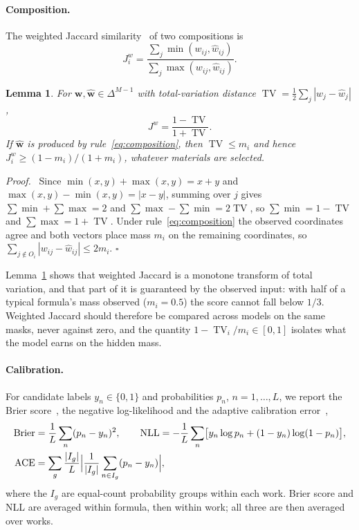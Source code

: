 \documentclass[applsci,article,submit,oneauthor]{Definitions/mdpi}
\newcommand{\TV}{\operatorname{TV}}
\newtheorem{xlem}{Lemma}
\newenvironment{xproof}{\par\noindent\textit{Proof.}\ }{\hfill$\square$\par\medskip}
\begin{document}
\paragraph{Composition.} The weighted Jaccard similarity~\cite{ioffe2010} of two compositions is
\begin{equation}
J^{w}_i=\frac{\sum_j\min(w_{ij},\widehat w_{ij})}{\sum_j\max(w_{ij},\widehat w_{ij})}.
\label{eq:wj}
\end{equation}

\begin{xlem}
\label{lem:wj}
For $\bm w,\widehat{\bm w}\in\Delta^{M-1}$ with total-variation distance $\TV=\frac12\sum_j|w_j-\widehat w_j|$,
\begin{equation}
J^{w}=\frac{1-\TV}{1+\TV}.
\label{eq:wjtv}
\end{equation}
If $\widehat{\bm w}$ is produced by rule~\eqref{eq:composition}, then $\TV\le m_i$ and hence $J^w_i\ge(1-m_i)/(1+m_i)$, whatever materials are selected.
\end{xlem}
\begin{xproof}
Since $\min(x,y)+\max(x,y)=x+y$ and $\max(x,y)-\min(x,y)=|x-y|$, summing over $j$ gives $\sum\min+\sum\max=2$ and $\sum\max-\sum\min=2\TV$, so $\sum\min=1-\TV$ and $\sum\max=1+\TV$. Under rule~\eqref{eq:composition} the observed coordinates agree and both vectors place mass $m_i$ on the remaining coordinates, so $\sum_{j\notin O_i}|w_{ij}-\widehat w_{ij}|\le2m_i$.
\end{xproof}

Lemma~\ref{lem:wj} shows that weighted Jaccard is a monotone transform of total variation, and that part of it is guaranteed by the observed input: with half of a typical formula's mass observed ($m_i=0.5$) the score cannot fall below $1/3$. Weighted Jaccard should therefore be compared across models on the same masks, never against zero, and the quantity $1-\TV_i/m_i\in[0,1]$ isolates what the model earns on the hidden mass.

\paragraph{Calibration.} For candidate labels $y_n\in\{0,1\}$ and probabilities $p_n$, $n=1,\dots,L$, we report the Brier score~\cite{brier1950}, the negative log-likelihood and the adaptive calibration error~\cite{nixon2019},
\begin{align}
\mathrm{Brier}&=\frac1L\sum_n(p_n-y_n)^2,\qquad
\mathrm{NLL}=-\frac1L\sum_n\bigl[y_n\log p_n+(1-y_n)\log(1-p_n)\bigr],\nonumber\\
\mathrm{ACE}&=\sum_{g}\frac{|I_g|}{L}\Bigl|\frac1{|I_g|}\sum_{n\in I_g}(p_n-y_n)\Bigr|,
\label{eq:calmetrics}
\end{align}
where the $I_g$ are equal-count probability groups within each work. Brier score and NLL are averaged within formula, then within work; all three are then averaged over works.
\end{document}
